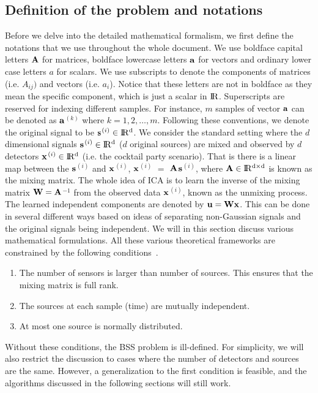 \documentclass[aps,prl,preprint,superscriptaddress]{revtex4-2}
\begin{document}
\subsection{Definition of the problem and notations}
Before we delve into the detailed mathematical formalism, we first define the notations that we use throughout the whole document. We use boldface capital letters $\bf{A}$ for matrices, boldface lowercase letters $\bf{a}$ for vectors and ordinary lower case letters $a$ for scalars. We use subscripts to denote the components of matrices (i.e. $A_{ij})$ and vectors (i.e. $a_{i}$). Notice that these letters are not in boldface as they mean the specific component, which is just a scalar in $ \rm I\!R$. Superscripts are reserved for indexing different samples. For instance, $m$ samples of vector $\bf{a}$ can be denoted as $\bf{a}$$^{(k)}$ where $k = 1, 2, \ldots, m$. Following these conventions, we denote the original signal to be $\bf{s}$$^{(i)} \in \rm I\!R^{d}$. We consider the standard setting where the $d$ dimensional signals $\bf{s}$$^{(i)} \in \rm I\!R^{d}$ ($d$ original sources) are mixed and observed by $d$ detectors $\bf{x}$$^{(i)} \in \rm I\!R^{d}$ (i.e. the cocktail party scenario). That is there is a linear map between the $\bf{s}$$^{(i)}$ and $\bf{x}$$^{(i)}$, $\bf{x}$$^{(i)}$ $=$ $\bf{A}$$\bf{s}$$^{(i)}$, where $\bf{A} \in \rm I\!R^{d\times d}$ is known as the mixing matrix. The whole idea of ICA is to learn the inverse of the mixing matrix $\bf{W} = \bf{A}$$^{-1}$ from the observed data $\bf{x}$$^{(i)}$, known as the unmixing process. The learned independent components are denoted by $\bf{u} = \bf{W}\bf{x}$. This can be done in several different ways based on ideas of separating non-Gaussian signals and the original signals being independent. We will in this section discuss various mathematical formulations. All these various theoretical frameworks are constrained by the following conditions~\cite{lee1998independent}.
\begin{enumerate}
\item The number of sensors is larger than number of sources. This ensures that the mixing matrix is full rank.
\item The sources at each sample (time) are mutually independent.
\item At most one source is normally distributed.
\end{enumerate}
Without these conditions, the BSS problem is ill-defined. For simplicity, we will also restrict the discussion to cases where the number of detectors and sources are the same.
However, a generalization to the first condition is feasible, and the algorithms discussed in the following sections will still work.
\end{document}
